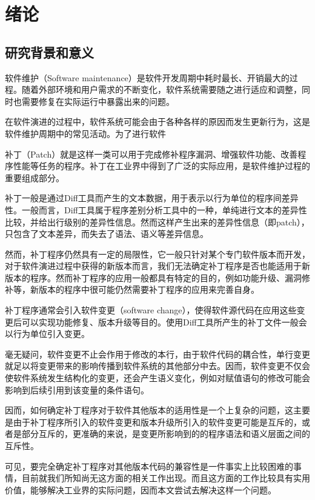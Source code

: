 \chapter{绪论}
\section{研究背景和意义}

软件维护（Software maintenance）是软件开发周期中耗时最长、开销最大的过程。随着外部环境和用户需求的不断变化，软件系统需要随之进行适应和调整，同时也需要修复在实际运行中暴露出来的问题。

在软件演进的过程中，软件系统可能会由于各种各样的原因而发生更新行为，这是软件维护周期中的常见活动。为了进行软件

补丁（Patch）就是这样一类可以用于完成修补程序漏洞、增强软件功能、改善程序性能等任务的程序。补丁在工业界中得到了广泛的实际应用，是软件维护过程的重要组成部分。

补丁一般是通过Diff工具而产生的文本数据，用于表示以行为单位的程序间差异性。一般而言，Diff工具属于程序差别分析工具中的一种，单纯进行文本的差异性比较，并给出行级别的差异性信息。然而这样产生出来的差异性信息（即patch），只包含了文本差异，而失去了语法、语义等差异信息。

然而，补丁程序仍然具有一定的局限性，它一般只针对某个专门软件版本而开发，对于软件演进过程中获得的新版本而言，我们无法确定补丁程序是否也能适用于新版本的程序。然而补丁程序的应用一般都具有特定的目的，例如功能升级、漏洞修补等，新版本的程序中很可能仍然需要补丁程序的应用来完善自身。

补丁程序通常会引入软件变更（software change），使得软件源代码在应用这些变更后可以实现功能修复、版本升级等目的。使用Diff工具所产生的补丁文件一般会以行为单位引入变更。

毫无疑问，软件变更不止会作用于修改的本行，由于软件代码的耦合性，单行变更就足以将变更带来的影响传播到软件系统的其他部分中去。因而，软件变更不仅会使软件系统发生结构化的变更，还会产生语义变化，例如对赋值语句的修改可能会影响到后续引用到该变量的条件语句。

因而，如何确定补丁程序对于软件其他版本的适用性是一个上复杂的问题，这主要是由于补丁程序所引入的软件变更和版本升级所引入的软件变更可能是互斥的，或者是部分互斥的，更准确的来说，是变更所影响到的的程序语法和语义层面之间的互斥性。

可见，要完全确定补丁程序对其他版本代码的兼容性是一件事实上比较困难的事情，目前就我们所知尚无这方面的相关工作出现。而且这方面的工作比较具有实用价值，能够解决工业界的实际问题，因而本文尝试去解决这样一个问题。



